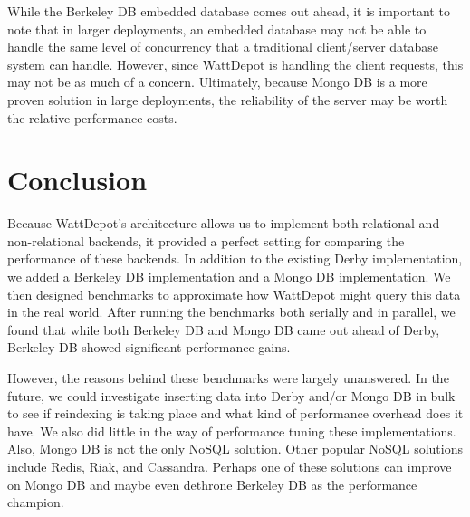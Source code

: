 \documentclass{sig-alternate}
\begin{document}
While the Berkeley DB embedded database comes out ahead, it is important to note that in larger deployments, an embedded database may not be able to handle the same level of concurrency that a traditional client/server database system can handle.  However, since WattDepot is handling the client requests, this may not be as much of a concern.  Ultimately, because Mongo DB is a more proven solution in large deployments, the reliability of the server may be worth the relative performance costs.

\section{Conclusion}
\label{sec:conclusion}

Because WattDepot's architecture allows us to implement both relational and non-relational backends, it provided a perfect setting for comparing the performance of these backends.  In addition to the existing Derby implementation, we added a Berkeley DB implementation and a Mongo DB implementation.  We then designed benchmarks to approximate how WattDepot might query this data in the real world.  After running the benchmarks both serially and in parallel, we found that while both Berkeley DB and Mongo DB came out ahead of Derby, Berkeley DB showed significant performance gains.

However, the reasons behind these benchmarks were largely unanswered.  In the future, we could investigate inserting data into Derby and/or Mongo DB in bulk to see if reindexing is taking place and what kind of performance overhead does it have.  We also did little in the way of performance tuning these implementations.  Also, Mongo DB is not the only NoSQL solution.  Other popular NoSQL solutions include Redis, Riak, and Cassandra.  Perhaps one of these solutions can improve on Mongo DB and maybe even dethrone Berkeley DB as the performance champion.



\end{document}
